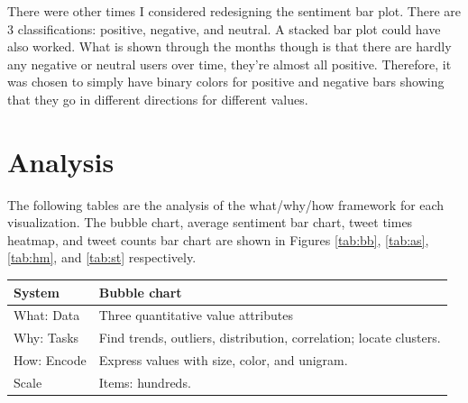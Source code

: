 \documentclass[journal]{vgtc}                %
\begin{document}
There were other times I considered redesigning the sentiment bar plot.
There are 3 classifications: positive, negative, and neutral.
A stacked bar plot could have also worked.
What is shown through the months though is that there are hardly any negative or neutral users over time, they're almost all positive.
Therefore, it was chosen to simply have binary colors for positive and negative bars showing that they go in different directions for different values.


\section{Analysis}

The following tables are the analysis of the what/why/how framework for each visualization. 
The bubble chart, average sentiment bar chart, tweet times heatmap, and tweet counts bar chart are shown in Figures \ref{tab:bb}, \ref{tab:as}, \ref{tab:hm}, and \ref{tab:st} respectively.

\begin{center}
     \label{tab:bb} 
    \begin{tabular}{ | l | p{4cm} |}
    \hline
    System   & Bubble chart \\ \hline
    What: Data   &  Three quantitative value attributes \\ \hline
    Why: Tasks  & Find trends, outliers, distribution, correlation; locate clusters. \\ \hline
    How: Encode   & Express values with size, color, and unigram. \\ \hline
    Scale  & Items: hundreds. \\ \hline
    \end{tabular}
\end{center}
\end{document}
